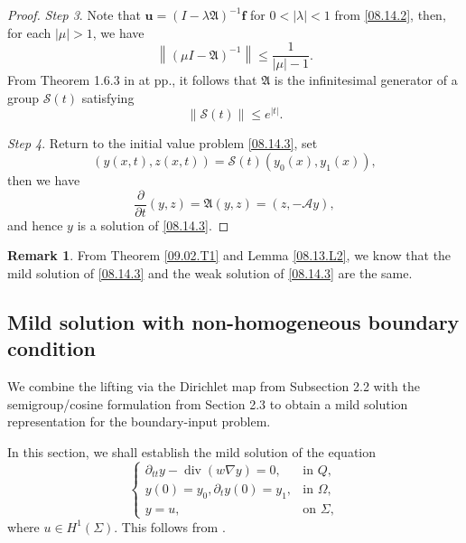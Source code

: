 \documentclass[preprint,12pt]{elsarticle}
\theoremstyle{definition}   %
\newtheorem{remark}[theorem]{Remark}
\numberwithin{equation}{section}
\def\pt{\partial}
\def\bs{\boldsymbol}
\def\mf{\mathfrak}
\def\pt{\partial}
\def\Om{\Omega}
\def\la{\lambda}
\def\f{\frac}
\def\mcS{\mathcal{S}}
\def\mcA{\mathcal{A}}
\DeclareMathOperator{\Div}{div}
\begin{document}
\begin{proof}
	{\it Step 3}. 
	Note that $\bs u=(I-\la \mf{A})^{-1}\bs f$ for $0<|\la|<1$ from \eqref{08.14.2}, then, for each $|\mu|>1$, we have 
	\begin{equation*}
		\left\|(\mu I-\mf{A})^{-1}\right\|\leq \f{1}{|\mu|-1}. 
	\end{equation*}
	From Theorem 1.6.3 in \cite{Pazy} at pp., it follows that $\mf{A}$ is the infinitesimal generator  of a group $\mcS(t)$ satisfying 
	\begin{equation*}
		\|\mcS(t)\|\leq e^{|t|}. 
	\end{equation*}
	
	{\it Step 4}. Return to the initial value problem \eqref{08.14.3}, 
	set 
	\begin{equation}\label{08.16.1}
		(y(x,t), z(x,t))=\mcS(t)(y_0(x),y_1(x)),
	\end{equation}
	then we have 
	\begin{equation*}
		\f{\pt}{\pt t}(y,z)=\mf{A}(y,z)=(z, -\mcA y), 
	\end{equation*}
	and hence $y$ is a solution of \eqref{08.14.3}. 
\end{proof}

\begin{remark}\label{08.14.R1}
	From Theorem \ref{09.02.T1} and Lemma \ref{08.13.L2}, we know that the mild solution of \eqref{08.14.3} and the weak solution of \eqref{08.14.3} are the same. 
\end{remark}


\subsection{Mild solution with non-homogeneous boundary condition}

We combine the lifting via the Dirichlet map from Subsection 2.2 with the semigroup/cosine formulation from Section 2.3 to obtain a mild solution representation for the boundary-input problem.


In this section, we shall establish the mild solution of the equation 
\begin{equation}\label{09.18.1}
	\begin{cases} 
		\pt_{tt}y-\Div(w\nabla y)=0, &\mbox{in }Q,\\
		y(0)=y_0, \pt_t y(0)=y_1, &\mbox{in }\Om,\\
		y=u, &\mbox{on }\Sigma, 
	\end{cases}
\end{equation}
where $u\in H^1(\Sigma)$. This follows from \cite{Lasiecka1,Lasiecka2}.
\end{document}
